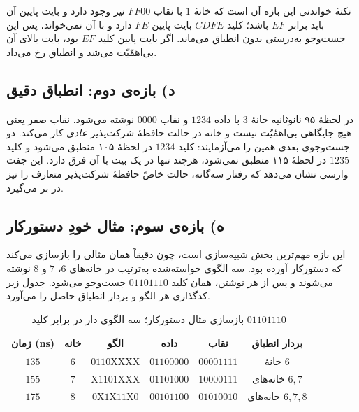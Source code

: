 \documentclass[12pt,a4paper]{article}
\begin{document}
	نکتهٔ خواندنی این بازه آن است که خانهٔ \(1\) با نقاب \(FF00\) نیز وجود دارد و بایت پایین آن باید برابر \(EF\) باشد؛ کلید \(CDFE\) بایت پایین \(FE\) دارد و با آن نمی‌خواند، پس این جست‌وجو به‌درستی بدون انطباق می‌ماند. اگر بایت پایین کلید \(EF\) بود، بایت بالای آن بی‌اهمّیّت می‌شد و انطباق رخ می‌داد.

	\subsection*{د) بازه‌ی دوم: انطباق دقیق}

	در لحظهٔ ۹۵ نانوثانیه خانهٔ \(3\) با داده \(1234\) و نقاب \(0000\) نوشته می‌شود. نقاب صفر یعنی هیچ جایگاهی بی‌اهمّیّت نیست و خانه در حالت حافظهٔ شرکت‌پذیر \emph{عادی} کار می‌کند. دو جست‌وجوی بعدی همین را می‌آزمایند: کلید \(1234\) در لحظهٔ ۱۰۵ منطبق می‌شود و کلید \(1235\) در لحظهٔ ۱۱۵ منطبق نمی‌شود، هرچند تنها در یک بیت با آن فرق دارد. این جفت وارسی نشان می‌دهد که رفتار سه‌گانه، حالت خاصّ حافظهٔ شرکت‌پذیر متعارف را نیز در بر می‌گیرد.

	\subsection*{ه) بازه‌ی سوم: مثال خودِ دستورکار}

	این بازه مهم‌ترین بخش شبیه‌سازی است، چون دقیقاً همان مثالی را بازسازی می‌کند که دستورکار آورده بود. سه الگوی خواسته‌شده به‌ترتیب در خانه‌های \(6\)، \(7\) و \(8\) نوشته می‌شوند و پس از هر نوشتن، همان کلید \(01101110\) جست‌وجو می‌شود. جدول زیر کدگذاری هر الگو و بردار انطباق حاصل را می‌آورد.

	\begin{table}[H]
		\centering
		\footnotesize
		\begin{tabular}{|c|c|c|c|c|c|}
			\hline
			\textbf{زمان (ns)} & \textbf{خانه} & \textbf{الگو} & \textbf{داده} & \textbf{نقاب} & \textbf{بردار انطباق} \\ \hline
			\(135\) & \(6\) & \(0110\mathrm{XXXX}\)      & \(01100000\) & \(00001111\) & خانهٔ \(6\) \\ \hline
			\(155\) & \(7\) & \(\mathrm{X}1101\mathrm{XXX}\) & \(01101000\) & \(10000111\) & خانه‌های \(6,7\) \\ \hline
			\(175\) & \(8\) & \(0\mathrm{X}1\mathrm{X}11\mathrm{X}0\) & \(00101100\) & \(01010010\) & خانه‌های \(6,7,8\) \\ \hline
		\end{tabular}
		\caption{بازسازی مثال دستورکار؛ سه الگوی دار در برابر کلید \(01101110\)}
	\end{table}
\end{document}
